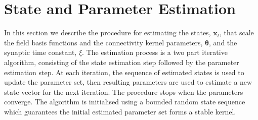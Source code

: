 \documentclass[12pt]{iopart}
\begin{document}
% 
\section{State and Parameter Estimation}\label{StateAndParameterEstimationSection} In this section we describe the procedure for estimating the states, $\mathbf{x}_t$, that scale the field basis functions and the connectivity kernel parameters, $\boldsymbol \theta$, and the synaptic time constant, $\xi$. The estimation process is a two part iterative algorithm, consisting of the state estimation step followed by the parameter estimation step. At each iteration, the sequence of estimated states is used to update the parameter set, then resulting parameters are used to estimate a new state vector for the next iteration. The procedure stops when the parameters converge. The algorithm is initialised using a bounded random state sequence which guarantees the initial estimated parameter set forms a stable kernel.
\end{document}
